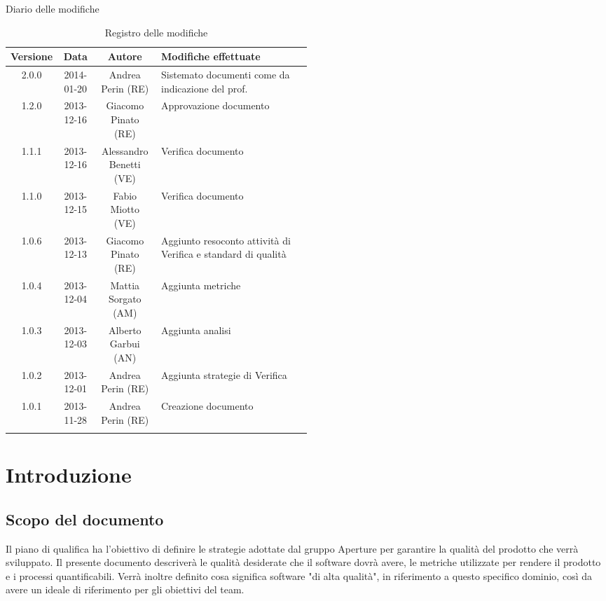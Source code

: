 
\newpage
Diario delle modifiche
\begin{center}
\begin{longtable}{|c|c|c|p{0.5\linewidth}|}
\toprule
\textbf{Versione} & \textbf{Data} & \textbf{Autore} & \textbf{Modifiche effettuate}\\

\midrule
2.0.0 & 2014-01-20 & Andrea Perin (RE) & Sistemato documenti come da indicazione del prof.\\
\midrule
1.2.0 & 2013-12-16 & Giacomo Pinato (RE) & Approvazione documento\\
\midrule
1.1.1 & 2013-12-16 & Alessandro Benetti (VE) & Verifica documento\\
\midrule
1.1.0 & 2013-12-15 & Fabio Miotto (VE) & Verifica documento\\
\midrule
1.0.6 & 2013-12-13 & Giacomo Pinato (RE) & Aggiunto resoconto attività di Verifica e standard di qualità\\
\midrule
1.0.4 & 2013-12-04 & Mattia Sorgato (AM) & Aggiunta metriche\\
\midrule
1.0.3 & 2013-12-03 & Alberto Garbui (AN) & Aggiunta analisi\\
\midrule
1.0.2 & 2013-12-01 & Andrea Perin (RE) & Aggiunta strategie di Verifica\\
\midrule
1.0.1 & 2013-11-28 & Andrea Perin (RE) & Creazione documento\\

\bottomrule
\caption{Registro delle modifiche}
\label{tab:changelog}
\end{longtable}
\end{center}

\newpage
\tableofcontents

\newpage
\listoftables
\listoffigures

\newpage
\section{Introduzione}%
\label{1.0}
\subsection{Scopo del documento}%
\label{1.1}
Il piano di qualifica ha l'obiettivo di definire le strategie adottate dal gruppo Aperture  per garantire la qualità del prodotto che verrà sviluppato.
Il presente documento descriverà le qualità desiderate che il software dovrà avere, le metriche utilizzate per rendere il prodotto e i processi quantificabili. Verrà inoltre definito cosa significa software "di alta qualità", in riferimento a questo specifico dominio, così da avere un ideale di riferimento per gli obiettivi del team.

